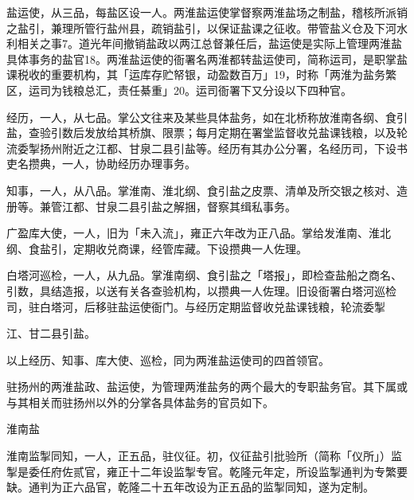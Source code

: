 盐运使，从三品，每盐区设一人。两淮盐运使掌督察两淮盐场之制盐，稽核所派销之盐引，兼理所管行盐州县，疏销盐引，以保证盐课之征收。带管盐义仓及下河水利相关之事7。道光年间撤销盐政以两江总督兼任后，盐运使是实际上管理两淮盐具体事务的盐官18。两淮盐运使的衙署名两淮都转盐运使司，简称运司，是职掌盐课税收的重要机构，其「运库存贮帑银，动盈数百万」19，时称「两淮为盐务繁区，运司为钱粮总汇，责任綦重」20。运司衙署下又分设以下四种官。

经历，一人，从七品。掌公文往来及某些具体盐务，如在北桥称放淮南各纲、食引盐，查验引数后发放给其桥旗、限票；每月定期在署堂监督收兑盐课钱粮，以及轮流委掣扬州附近之江都、甘泉二县引盐等。经历有其办公分署，名经历司，下设书吏名攒典，一人，协助经历办理事务。

知事，一人，从八品。掌淮南、淮北纲、食引盐之皮票、清单及所交银之核对、造册等。兼管江都、甘泉二县引盐之解捆，督察其缉私事务。

广盈库大使，一人，旧为「未入流」，雍正六年改为正八品。掌给发淮南、淮北纲、食盐引，定期收兑商课，经管库藏。下设攒典一人佐理。

白塔河巡检，一人，从九品。掌淮南纲、食引盐之「塔报」，即检查盐船之商名、引数，具结造报，以送有关各查验机构，以攒典一人佐理。旧设衙署白塔河巡检司，驻白塔河，后移驻盐运使衙门。与经历定期监督收兑盐课钱粮，轮流委掣

\vfill
\begin{BookNotes}
\end{BookNotes}

\noindent 江、甘二县引盐。

以上经历、知事、库大使、巡检，同为两淮盐运使司的四首领官。

驻扬州的两淮盐政、盐运使，为管理两淮盐务的两个最大的专职盐务官。其下属或与其相关而驻扬州以外的分掌各具体盐务的官员如下。

淮南盐

淮南监掣同知，一人，正五品，驻仪征。初，仪征盐引批验所（简称「仪所」）监掣是委任府佐贰官，雍正十二年设监掣专官。乾隆元年定，所设监掣通判为专繁要缺。通判为正六品官，乾隆二十五年改设为正五品的监掣同知，遂为定制。

